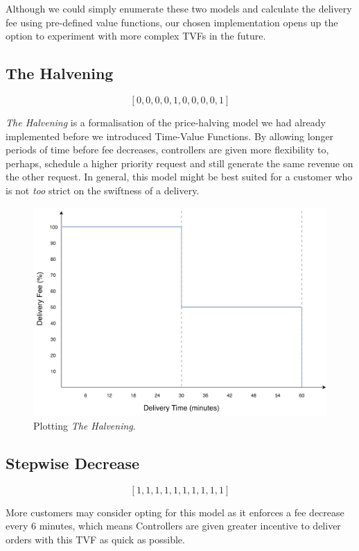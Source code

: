 \documentclass[a4paper,11pt,titlepage]{report}
\begin{document}
\clearpage
Although we could simply enumerate these two models and calculate the delivery fee using pre-defined value functions, our chosen implementation opens up the option to experiment with more complex TVFs in the future.

\subsection{The Halvening}
$$ [0, 0, 0, 0, 1, 0, 0, 0, 0, 1] $$

\textit{The Halvening} is a formalisation of the price-halving model we had already implemented before we introduced Time-Value Functions. By allowing longer periods of time before fee decreases, controllers are given more flexibility to, perhaps, schedule a higher priority request and still generate the same revenue on the other request. In general, this model might be best suited for a customer who is not \textit{too} strict on the swiftness of a delivery.

\begin{figure}[!hbpt]
  \center
  \includegraphics[width=\linewidth]{img/tvfs_halvening.png}
  \caption{Plotting \textit{The Halvening}.}
  \label{fig:tvfs_halvening}
\end{figure}

\clearpage
\subsection{Stepwise Decrease}
$$ [1, 1, 1, 1, 1, 1, 1, 1, 1, 1] $$

More customers may consider opting for this model as it enforces a fee decrease every 6 minutes, which means Controllers are given greater incentive to deliver orders with this TVF as quick as possible.
\end{document}
